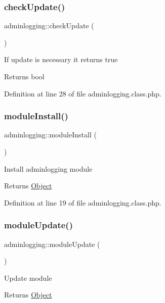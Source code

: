 \subsubsection{\texorpdfstring{check\+Update()}{checkUpdate()}}
{\footnotesize\ttfamily adminlogging\+::check\+Update (\begin{DoxyParamCaption}{ }\end{DoxyParamCaption})}

If update is necessary it returns true \begin{DoxyReturn}{Returns}
bool 
\end{DoxyReturn}


Definition at line 28 of file adminlogging.\+class.\+php.

\mbox{\label{classadminlogging_a177e26010673133e8a32bcb266416ff2}} 
\subsubsection{\texorpdfstring{module\+Install()}{moduleInstall()}}
{\footnotesize\ttfamily adminlogging\+::module\+Install (\begin{DoxyParamCaption}{ }\end{DoxyParamCaption})}

Install adminlogging module \begin{DoxyReturn}{Returns}
\hyperlink{classObject}{Object} 
\end{DoxyReturn}


Definition at line 19 of file adminlogging.\+class.\+php.

\mbox{\label{classadminlogging_ac07c04a3d4120d487311e4a89932c705}} 
\subsubsection{\texorpdfstring{module\+Update()}{moduleUpdate()}}
{\footnotesize\ttfamily adminlogging\+::module\+Update (\begin{DoxyParamCaption}{ }\end{DoxyParamCaption})}

Update module \begin{DoxyReturn}{Returns}
\hyperlink{classObject}{Object} 
\end{DoxyReturn}


